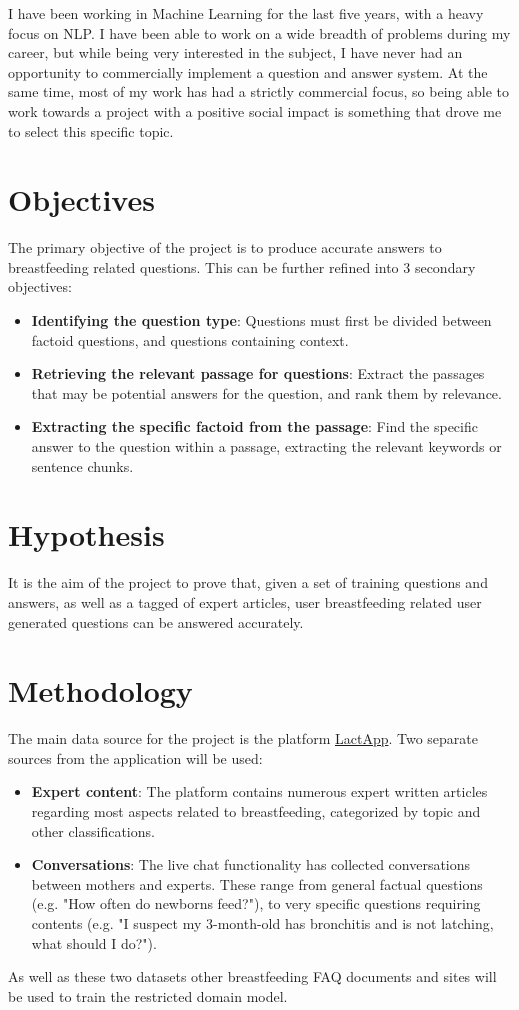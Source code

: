 I have been working in Machine Learning for the last five years, with a heavy focus on NLP. I have been able to work on a wide breadth of problems during my career, but while being very interested in the subject, I have never had an opportunity to commercially implement a question and answer system. At the same time, most of my work has had a strictly commercial focus, so being able to work towards a project with a positive social impact is something that drove me to select this specific topic.

\section{Objectives}

The primary objective of the project is to produce accurate answers to breastfeeding related questions. This can be further refined into 3 secondary objectives:
\begin{itemize}
	\item \textbf{Identifying the question type}: Questions must first be divided between factoid questions, and questions containing context.
	\item \textbf{Retrieving the relevant passage for questions}: Extract the passages that may be potential answers for the question, and rank them by relevance.
	\item \textbf{Extracting the specific factoid from the passage}: Find the specific answer to the question within a passage, extracting the relevant keywords or sentence chunks.
\end{itemize}


\section{Hypothesis}
It is the aim of the project to prove that, given a set of training questions and answers, as well as a tagged of expert articles, user breastfeeding related user generated questions can be answered accurately.


\section{Methodology}
The main data source for the project is the platform \href{https://lactapp.com/}{LactApp}. Two separate sources from the application will be used:
\begin{itemize}
	\item \textbf{Expert content}: The platform contains numerous expert written articles regarding most aspects related to breastfeeding, categorized by topic and other classifications.
	\item \textbf{Conversations}: The live chat functionality has collected conversations between mothers and experts. These range from general factual questions (e.g. "How often do newborns feed?"),
	 to very specific questions requiring contents (e.g. "I suspect my 3-month-old has bronchitis and is not latching, what should I do?").
\end{itemize}
As well as these two datasets other breastfeeding FAQ documents and sites will be used to train the restricted domain model.

